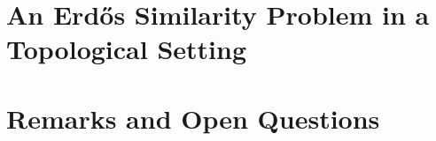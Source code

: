 \documentclass[12pt,oneside]{sfsuthesis}
\begin{document}
\chapter{An Erd\H{o}s Similarity Problem in a Topological Setting}



\chapter{Remarks and Open Questions}




\printbibliography
\end{document}
